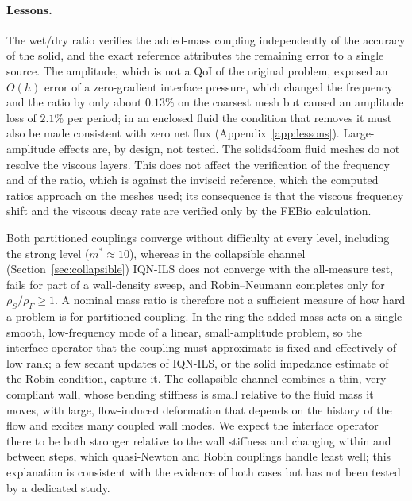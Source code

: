 \paragraph{Lessons.}
The wet/dry ratio verifies the added-mass coupling independently of the accuracy of the solid, and the exact reference attributes the remaining error to a single source.
The amplitude, which is not a QoI of the original problem, exposed an $O(h)$ error of a zero-gradient interface pressure, which changed the frequency and the ratio by only about $0.13\%$ on the coarsest mesh but caused an amplitude loss of $2.1\%$ per period; in an enclosed fluid the condition that removes it must also be made consistent with zero net flux (Appendix~\ref{app:lessons}).
Large-amplitude effects are, by design, not tested.
The solids4foam fluid meshes do not resolve the viscous layers. This does not affect the verification of the frequency and of the ratio, which is against the inviscid reference, which the computed ratios approach on the meshes used; its consequence is that the viscous frequency shift and the viscous decay rate are verified only by the FEBio calculation.

Both partitioned couplings converge without difficulty at every level, including the strong level ($m^* \approx 10$), whereas in the collapsible channel (Section~\ref{sec:collapsible}) IQN-ILS does not converge with the all-measure test, fails for part of a wall-density sweep, and Robin--Neumann completes only for $\rho_S/\rho_F \geq 1$.
A nominal mass ratio is therefore not a sufficient measure of how hard a problem is for partitioned coupling.
In the ring the added mass acts on a single smooth, low-frequency mode of a linear, small-amplitude problem, so the interface operator that the coupling must approximate is fixed and effectively of low rank; a few secant updates of IQN-ILS, or the solid impedance estimate of the Robin condition, capture it.
The collapsible channel combines a thin, very compliant wall, whose bending stiffness is small relative to the fluid mass it moves, with large, flow-induced deformation that depends on the history of the flow and excites many coupled wall modes.
We expect the interface operator there to be both stronger relative to the wall stiffness and changing within and between steps, which quasi-Newton and Robin couplings handle least well; this explanation is consistent with the evidence of both cases but has not been tested by a dedicated study.

